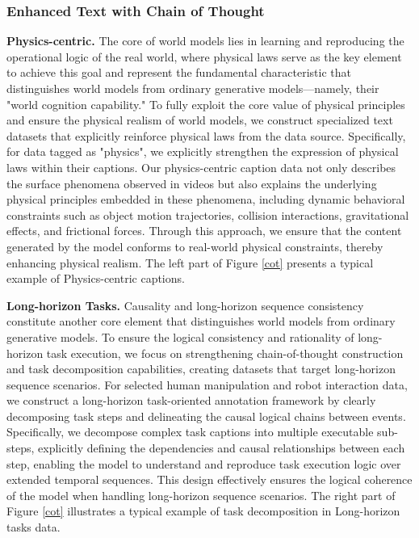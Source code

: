 \documentclass{llmxive}
\begin{document}
\subsubsection{Enhanced Text with Chain of Thought}

\textbf{Physics-centric.}
The core of world models lies in learning and reproducing the operational logic of the real world, where physical laws serve as the key element to achieve this goal and represent the fundamental characteristic that distinguishes world models from ordinary generative models—namely, their "world cognition capability." To fully exploit the core value of physical principles and ensure the physical realism of world models, we construct specialized text datasets that explicitly reinforce physical laws from the data source.
Specifically, for data tagged as "physics", we explicitly strengthen the expression of physical laws within their captions. Our physics-centric caption data not only describes the surface phenomena observed in videos but also explains the underlying physical principles embedded in these phenomena, including dynamic behavioral constraints such as object motion trajectories, collision interactions, gravitational effects, and frictional forces. Through this approach, we ensure that the content generated by the model conforms to real-world physical constraints, thereby enhancing physical realism.
The left part of Figure \ref{cot} presents a typical example of Physics-centric captions.

\textbf{Long-horizon Tasks.}
Causality and long-horizon sequence consistency constitute another core element that distinguishes world models from ordinary generative models. To ensure the logical consistency and rationality of long-horizon task execution, we focus on strengthening chain-of-thought construction and task decomposition capabilities, creating datasets that target long-horizon sequence scenarios.
For selected human manipulation and robot interaction data, we construct a long-horizon task-oriented annotation framework by clearly decomposing task steps and delineating the causal logical chains between events. Specifically, we decompose complex task captions into multiple executable sub-steps, explicitly defining the dependencies and causal relationships between each step, enabling the model to understand and reproduce task execution logic over extended temporal sequences. This design effectively ensures the logical coherence of the model when handling long-horizon sequence scenarios.
The right part of Figure \ref{cot} illustrates a typical example of task decomposition in Long-horizon tasks data.
\end{document}
